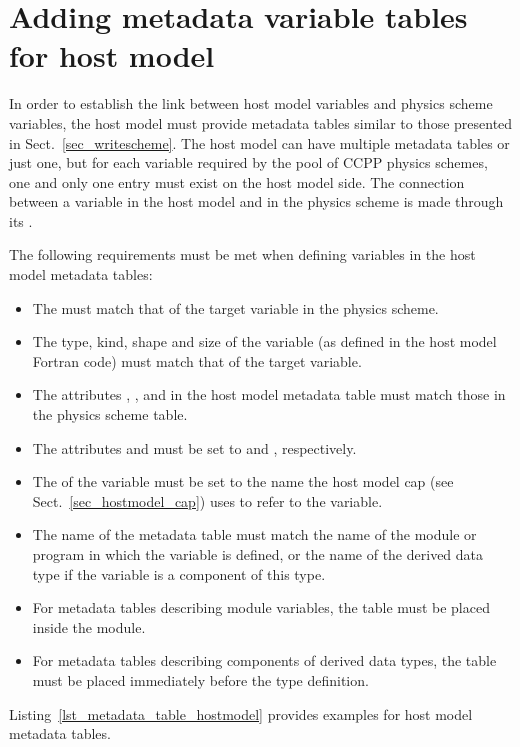 \section{Adding metadata variable tables for host model}
In order to establish the link between host model variables and physics scheme variables, the host model must provide metadata tables similar to those presented in Sect.~\ref{sec_writescheme}. The host model can have multiple metadata tables or just one, but for each variable required by the pool of CCPP physics schemes, one and only one entry must exist on the host model side. The connection between a variable in the host model and in the physics scheme is made through its .

The following requirements must be met when defining variables in the host model metadata tables:
\begin{itemize}
\item The  must match that of the target variable in the physics scheme.
\item The type, kind, shape and size of the variable (as defined in the host model Fortran code) must match that of the target variable.
\item The attributes , ,  and  in the host model metadata table must match those in the physics scheme table.
\item The attributes  and  must be set to  and , respectively.
\item The  of the variable must be set to the name the host model cap (see Sect.~\ref{sec_hostmodel_cap}) uses to refer to the variable.
\item The name of the metadata table must match the name of the module or program in which the variable is defined, or the name of the derived data type if the variable is a component of this type.
\item For metadata tables describing module variables, the table must be placed inside the module.
\item For metadata tables describing components of derived data types, the table must be placed immediately before the type definition.
\end{itemize}
Listing~\ref{lst_metadata_table_hostmodel} provides examples for host model metadata tables.
